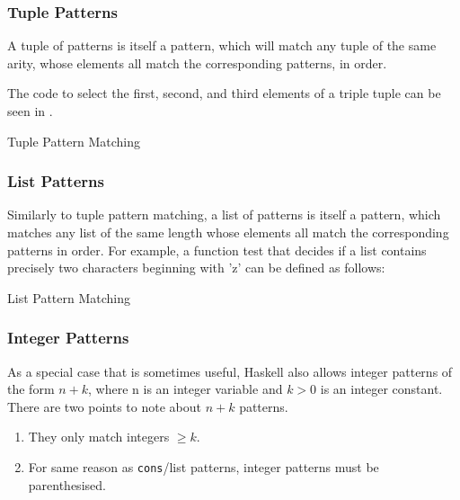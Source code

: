 \subsubsection{Tuple Patterns}\label{subsubsec:Tuple_Pattern_Matching}
A tuple of patterns is itself a pattern, which will match any tuple of the same arity, whose elements all match the corresponding patterns, in order.

The code to select the first, second, and third elements of a triple tuple can be seen in .
\begin{listing}[h!tbp]
\caption{Tuple Pattern Matching}
\label{lst:Tuple_Pattern_Matching}
\end{listing}

\subsubsection{List Patterns}\label{subsubsec:List_Pattern_Matching}
Similarly to tuple pattern matching, a list of patterns is itself a pattern, which matches any list of the same length whose elements all match the corresponding patterns in order.
For example, a function test that decides if a list contains precisely two characters beginning with ’z’ can be defined as follows:
\begin{listing}[h!tbp]
\caption{List Pattern Matching}
\label{lst:List_Pattern_Matching}
\end{listing}

\subsubsection{Integer Patterns}\label{subsubsec:Integer_Pattern_Matching}
As a special case that is sometimes useful, Haskell also allows integer patterns of the form $n + k$, where n is an integer variable and $k > 0$ is an integer constant.
There are two points to note about $n + k$ patterns.
\begin{enumerate}[noitemsep]
\item They only match integers $\geq k$.
\item For same reason as \texttt{cons}/list patterns, integer patterns must be parenthesised.
\end{enumerate}


